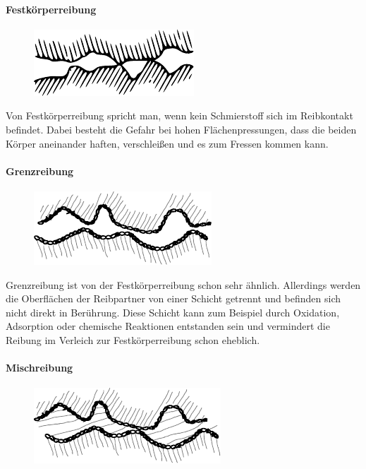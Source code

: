 \paragraph{Festkörperreibung}
\label{par:festkoerperreibung}
%
\begin{figure}
    \includegraphics[trim={0 1cm 0 1cm}]{./images/festkoerperreibung.pdf}
\end{figure}

Von Festkörperreibung spricht man, wenn kein Schmierstoff sich im Reibkontakt befindet.
Dabei besteht die Gefahr bei hohen Flächenpressungen, dass die beiden Körper aneinander haften, verschleißen und es zum Fressen kommen kann.

\paragraph{Grenzreibung}
\label{par:grenzreibung}
%
\begin{figure}
    \includegraphics[trim={0 0.5cm 0 0.5cm}]{./images/grenzreibung.pdf}
\end{figure}

Grenzreibung ist von der Festkörperreibung schon sehr ähnlich.
Allerdings werden die Oberflächen der Reibpartner von einer Schicht getrennt und befinden sich nicht direkt in Berührung.
Diese Schicht kann zum Beispiel durch Oxidation, Adsorption oder chemische Reaktionen entstanden sein und vermindert die Reibung im Verleich zur Festkörperreibung schon eheblich.

\paragraph{Mischreibung}
\label{par:mischreibung}
%
\begin{figure}
    \includegraphics[trim={0 0.5cm 0 0.5cm}]{./images/mischreibung.pdf}
\end{figure}

